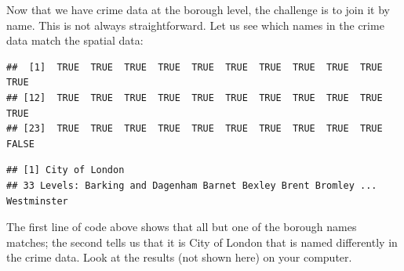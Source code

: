 \documentclass[]{article}
\newenvironment{Shaded}{}{}
\newcommand{\KeywordTok}[1]{\textcolor[rgb]{0.00,0.44,0.13}{\textbf{{#1}}}}
\newcommand{\DataTypeTok}[1]{\textcolor[rgb]{0.56,0.13,0.00}{{#1}}}
\newcommand{\DecValTok}[1]{\textcolor[rgb]{0.25,0.63,0.44}{{#1}}}
\newcommand{\StringTok}[1]{\textcolor[rgb]{0.25,0.44,0.63}{{#1}}}
\newcommand{\CommentTok}[1]{\textcolor[rgb]{0.38,0.63,0.69}{\textit{{#1}}}}
\newcommand{\NormalTok}[1]{{#1}}
\begin{document}
\begin{Shaded}
\end{Shaded}
Now that we have crime data at the borough level, the challenge is to
join it by name. This is not always straightforward. Let us see which
names in the crime data match the spatial data:

\begin{Shaded}
\end{Shaded}
\begin{verbatim}
##  [1]  TRUE  TRUE  TRUE  TRUE  TRUE  TRUE  TRUE  TRUE  TRUE  TRUE  TRUE
## [12]  TRUE  TRUE  TRUE  TRUE  TRUE  TRUE  TRUE  TRUE  TRUE  TRUE  TRUE
## [23]  TRUE  TRUE  TRUE  TRUE  TRUE  TRUE  TRUE  TRUE  TRUE  TRUE FALSE
\end{verbatim}
\begin{Shaded}
\end{Shaded}
\begin{verbatim}
## [1] City of London
## 33 Levels: Barking and Dagenham Barnet Bexley Brent Bromley ... Westminster
\end{verbatim}
The first line of code above shows that all but one of the borough names
matches; the second tells us that it is City of London that is named
differently in the crime data. Look at the results (not shown here) on
your computer.
\end{document}
